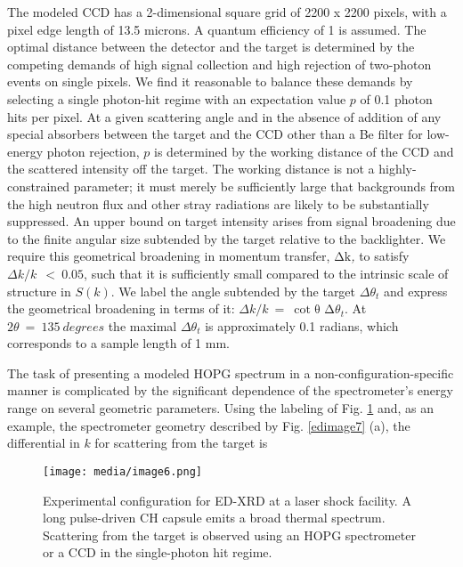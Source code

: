 \FloatBarrier

The modeled CCD has a 2-dimensional square grid of 2200 x 2200 pixels,
with a pixel edge length of 13.5 microns. A quantum efficiency of 1 is
assumed. The optimal distance between the detector and the target is
determined by the competing demands of high signal collection and high
rejection of two-photon events on single pixels. We find it reasonable
to balance these demands by selecting a single photon-hit regime with an
expectation value \(p\) of 0.1 photon hits per pixel. At a given
scattering angle and in the absence of addition of any special absorbers
between the target and the CCD other than a Be filter for low-energy
photon rejection, \(p\) is determined by the working distance of the CCD
and the scattered intensity off the target. The working distance is not
a highly-constrained parameter; it must merely be sufficiently large
that backgrounds from the high neutron flux and other stray radiations
are likely to be substantially suppressed. An upper bound on target
intensity arises from signal broadening due to the finite angular size
subtended by the target relative to the backlighter. We require this
geometrical broadening in momentum transfer, \(\text{Δk}\)\emph{,} to
satisfy \(\Delta k/k\ \  < \ 0.05\), such that it is sufficiently small
compared to the intrinsic scale of structure in \(S(k)\). We label the
angle subtended by the target \(\Delta\theta_{t}\) and express the
geometrical broadening in terms of it:
\(\Delta k/k\  = \ \cot{\text{θ\ Δ}\theta_{t}}.\) At
\(2\theta\  = \ 135\ degrees\) the maximal \(\Delta\theta_{t}\) is
approximately 0.1 radians, which corresponds to a sample length of 1 mm.

The task of presenting a modeled HOPG spectrum in a
non-configuration-specific manner is complicated by the significant
dependence of the spectrometer's energy range on several geometric
parameters. Using the labeling of Fig. \ref{edimage6} and, as an example, the
spectrometer geometry described by Fig. \ref{edimage7} (a), the differential in \(k\)
for scattering from the target is

\begin{figure}[h] 
\caption{ Experimental configuration
for ED-XRD at a laser shock facility. A long pulse-driven CH capsule
emits a broad thermal spectrum. Scattering from the target is observed
using an HOPG spectrometer or a CCD in the single-photon hit regime.}
\label{edimage6}
\centering
\texttt{[image: media/image6.png]}
\end{figure}

